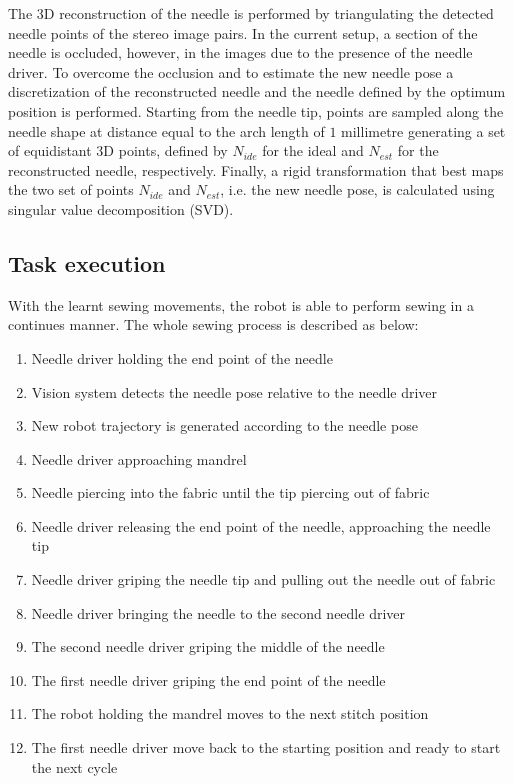 The 3D reconstruction of the needle is performed by triangulating the detected needle points of the stereo image pairs. In the current setup, a section of the needle is occluded, however, in the images due to the presence of the needle driver. To overcome the occlusion and to estimate the new needle pose a discretization of the reconstructed needle and the needle defined by the optimum position is performed. Starting from the needle tip, points are sampled along the needle shape at distance equal to the arch length of $1$ millimetre generating a set of equidistant 3D points, defined by $N_{ide}$ for the ideal and $N_{est}$ for the reconstructed needle, respectively. Finally, a rigid transformation that best maps the two set of points $N_{ide}$ and $N_{est}$, i.e. the new needle pose, is calculated using singular value decomposition (SVD).

\subsection{Task execution}

With the learnt sewing movements, the robot is able to perform sewing in a continues manner. The whole sewing process is described as below:

\begin{enumerate}
\item{Needle driver holding the end point of the needle}
\item{Vision system detects the needle pose relative to the needle driver}
\item{New robot trajectory is generated according to the needle pose}
\item{Needle driver approaching mandrel}
\item{Needle piercing into the fabric until the tip piercing out of fabric}
\item{Needle driver releasing the end point of the needle, approaching the needle tip}
\item{Needle driver griping the needle tip and pulling out the needle out of fabric}
\item{Needle driver bringing the needle to the second needle driver}
\item{The second needle driver griping the middle of the needle}
\item{The first needle driver griping the end point of the needle}
\item{The robot holding the mandrel moves to the next stitch position}
\item{The first needle driver move back to the starting position and ready to start the next cycle}
\end{enumerate}

